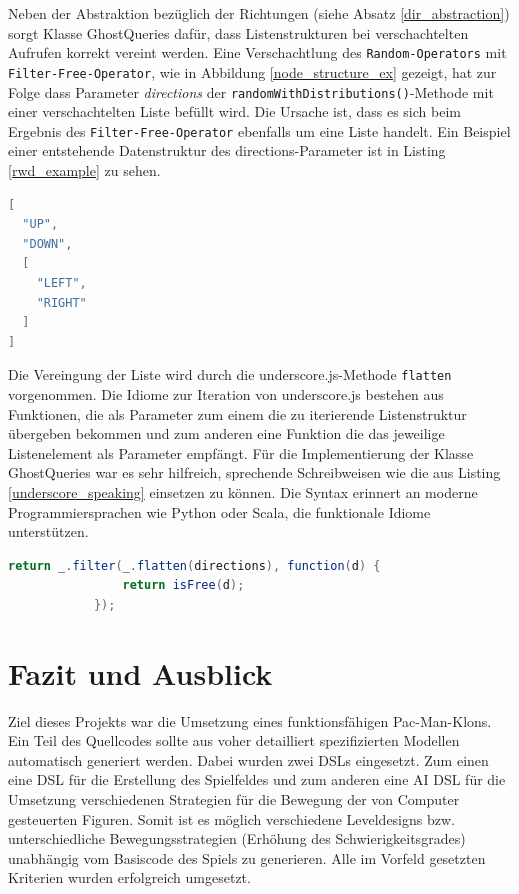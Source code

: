 \documentclass[conference]{IEEEtran}
\begin{document}
Neben der Abstraktion bezüglich der Richtungen (siehe Absatz \ref{dir_abstraction}) sorgt Klasse GhostQueries dafür, dass Listenstrukturen bei verschachtelten Aufrufen korrekt vereint werden. Eine Verschachtlung des \texttt{Random-Operators} mit \texttt{Filter-Free-Operator}, wie in
Abbildung \ref{node_structure_ex} gezeigt, hat zur Folge dass Parameter \emph{directions} der \texttt{randomWithDistributions()}-Methode mit einer verschachtelten Liste
befüllt wird. Die Ursache ist, dass es sich beim Ergebnis des \texttt{Filter-Free-Operator} ebenfalls um eine Liste handelt. Ein Beispiel einer entstehende Datenstruktur des directions-Parameter ist in Listing \ref{rwd_example} zu sehen.

\begin{lstlisting}[language=Java, captionpos=b, caption=Beispiel einer verschachtelten Datenstruktur als directions-Parameter von randomWithDistributions(), label=rwd_example]
[
  "UP",
  "DOWN",
  [
    "LEFT",
    "RIGHT"
  ]
]
\end{lstlisting}


Die Vereingung der Liste wird durch die underscore.js-Methode \texttt{flatten} vorgenommen. Die Idiome zur Iteration von underscore.js bestehen aus Funktionen,
die als Parameter zum einem die zu iterierende Listenstruktur übergeben bekommen und zum anderen eine Funktion die das jeweilige Listenelement
als Parameter empfängt. Für die Implementierung der Klasse GhostQueries war es sehr hilfreich, sprechende Schreibweisen wie die aus Listing \ref{underscore_speaking} einsetzen zu können. Die Syntax erinnert an moderne Programmiersprachen wie Python oder Scala, die funktionale Idiome unterstützen.

\begin{lstlisting}[language=Java, captionpos=b, caption=Implementierung der Filter-Free Methode mit Hilfe von funktionalen Hilfsmitteln von underscore.js, label=underscore_speaking]
return _.filter(_.flatten(directions), function(d) {
                return isFree(d);
            });
\end{lstlisting}


\section{Fazit und Ausblick}
Ziel dieses Projekts war die Umsetzung eines funktionsfähigen Pac-Man-Klons. Ein Teil des Quellcodes sollte aus voher detailliert spezifizierten Modellen automatisch generiert werden.  Dabei wurden zwei DSLs eingesetzt. Zum einen eine DSL für die Erstellung des Spielfeldes und zum anderen eine AI DSL für die Umsetzung verschiedenen Strategien für die Bewegung der von Computer gesteuerten Figuren. Somit ist es möglich verschiedene Leveldesigns bzw. unterschiedliche Bewegungsstrategien (Erhöhung des Schwierigkeitsgrades) unabhängig vom Basiscode des Spiels zu generieren. Alle im Vorfeld gesetzten Kriterien wurden erfolgreich umgesetzt.
\end{document}
